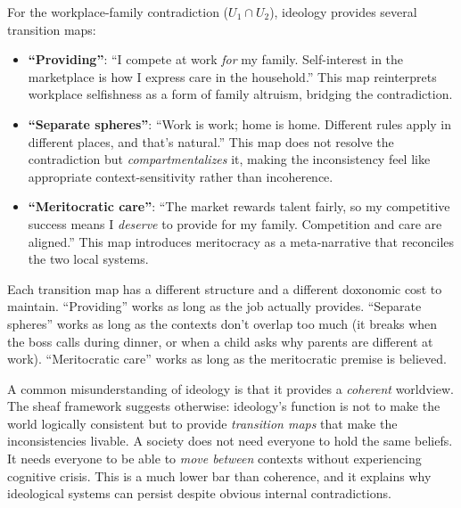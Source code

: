 \begin{example}
\label{ex:transition-maps}
For the workplace-family contradiction ($U_1 \cap U_2$), ideology provides several transition maps:
\begin{itemize}[nosep]
  \item \textbf{``Providing''}: ``I compete at work \emph{for} my family.
  Self-interest in the marketplace is how I express care in the household.''
  This map reinterprets workplace selfishness as a form of family altruism, bridging the contradiction.
  \item \textbf{``Separate spheres''}: ``Work is work; home is home.
  Different rules apply in different places, and that's natural.''
  This map does not resolve the contradiction but \emph{compartmentalizes} it, making the inconsistency feel like appropriate context-sensitivity rather than incoherence.
  \item \textbf{``Meritocratic care''}: ``The market rewards talent fairly, so my competitive success means I \emph{deserve} to provide for my family.
  Competition and care are aligned.''
  This map introduces meritocracy as a meta-narrative that reconciles the two local systems.
\end{itemize}
Each transition map has a different structure and a different doxonomic cost to maintain.
``Providing'' works as long as the job actually provides.
``Separate spheres'' works as long as the contexts don't overlap too much (it breaks when the boss calls during dinner, or when a child asks why parents are different at work).
``Meritocratic care'' works as long as the meritocratic premise is believed.
\end{example}

\begin{remark}
\label{rem:management}
A common misunderstanding of ideology is that it provides a \emph{coherent} worldview.
The sheaf framework suggests otherwise: ideology's function is not to make the world logically consistent but to provide \emph{transition maps} that make the inconsistencies livable.
A society does not need everyone to hold the same beliefs.
It needs everyone to be able to \emph{move between} contexts without experiencing cognitive crisis.
This is a much lower bar than coherence, and it explains why ideological systems can persist despite obvious internal contradictions.
\end{remark}


